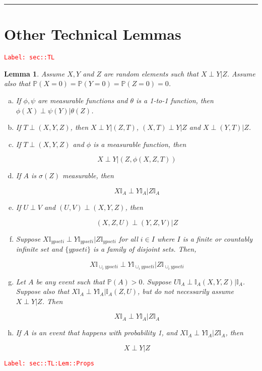 \documentclass[12pt]{article}
\newcommand{\mb}{\mathbb}
\newcommand{\tr}{\textcolor{red}}
\newcommand{\labe}[1]{\tr{\texttt{Label: #1}}}
\newcommand{\lin}{\rule{\linewidth}{0.4 pt}}
\newcommand{\pr}{\mb{P}}							%
\newcommand{\X}{X}								%
\newcommand{\XX}{Y}								%
\newcommand{\XXX}{Z}							%
\newcommand{\typset}{A}							%
\newtheorem{lem}[thms]{Lemma}
\begin{document}
\lin
\section{Other Technical Lemmas}
\label{sec::TL}\labe{sec::TL}

\begin{lem}
Assume \(\X,\XX\) and \(\XXX\) are random elements such that \(\X\perp \XX|\XXX\). Assume also that \(\pr(\X=0) = \pr(\XX=0) = \pr(\XXX=0) = 0\).

\begin{enumerate}[(a)]
\item If \(\phi,\psi\) are measurable functions and \(\theta\) is a 1-to-1 function, then \(\phi(\X)\perp \psi(\XX)|\theta(\XXX)\).

\item If \(T\perp(\X,\XX,\XXX)\), then \(\X\perp \XX|(\XXX,T)\), \((\X,T)\perp \XX|\XXX\) and \(\X\perp (\XX,T)|\XXX\).

\item If \(T\perp (\X,\XX,\XXX)\) and \(\phi\) is a measurable function, then

\[\X\perp \XX|(\XXX,\phi(\X,\XXX,T))\]

\item If \(\typset\) is \(\sigma(\XXX)\) measurable, then 

\[\X\mb{I}_\typset\perp \XX\mb{I}_\typset|\XXX\mb{I}_\typset\]

\item If \(U\perp V\) and \((U,V)\perp(\X,\XX,\XXX)\), then 

\[(\X,\XXX,U)\perp (\XX,\XXX,V)|\XXX\]

\item Suppose \(\X\mb{I}_{	ypset{i}}\perp \XX\mb{I}_{	ypset{i}}|\XXX\mb{I}_{	ypset{i}}\) for all \(i\in I\) where \(I\) is a finite or countably infinite set and \(\{	ypset{i}\}\) is a family of disjoint sets. Then,

\[\X\mb{I}_{\cup_i 	ypset{i}}\perp \XX\mb{I}_{\cup_i 	ypset{i}}|\XXX\mb{I}_{\cup_i 	ypset{i}}\]

\item Let \(\typset\) be any event such that \(\pr(\typset) > 0\). Suppose \(U\mb{I}_\typset\perp \mb{I}_\typset(\X,\XX,\XXX)|\mb{I}_\typset\). Suppose also that \(\X\mb{I}_\typset\perp \XX\mb{I}_\typset|\mb{I}_\typset(\XXX,U)\), but do not necessarily assume \(\X\perp \XX|\XXX\). Then 

\[\X\mb{I}_\typset\perp \XX\mb{I}_\typset|\XXX\mb{I}_\typset\]

\item If \(\typset\) is an event that happens with probability 1, and \(\X\mb{I}_\typset \perp \XX\mb{I}_\typset |\XXX\mb{I}_\typset\), then 

\[\X\perp \XX |\XXX\]
\end{enumerate}
\label{sec::TL:Lem::Props}
\end{lem}
\labe{sec::TL:Lem::Props}
\end{document}
